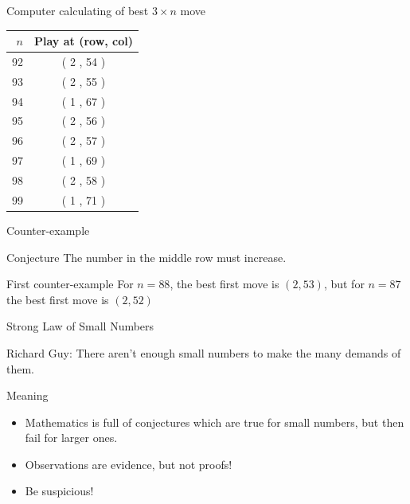 \documentclass{beamer}
\begin{document}
\begin{frame}{Computer calculating of best $3\times n$ move}
\begin{center}
\begin{tabular}{r|c}
\hline
$n$ & Play at (row, col) \\
\hline
92  & ( 2 , 54 ) \\
93  & ( 2 , 55 ) \\
94  & ( 1 , 67 ) \\
95  & ( 2 , 56 ) \\
96  & ( 2 , 57 ) \\
97  & ( 1 , 69 ) \\
98  & ( 2 , 58 ) \\
99  & ( 1 , 71 ) \\
\end{tabular}
\end{center}
\end{frame}

\begin{frame}{Counter-example}
  \begin{block}{Conjecture}
    The number in the middle row must increase.
  \end{block}
\pause
  \begin{block}{First counter-example}
    For $n=88$, the best first move is $(2,53)$, but for $n=87$ the best first move is $(2,52)$
  \end{block}
\end{frame}

\begin{frame}{Strong Law of Small Numbers}
\pause
  \begin{block}{Richard Guy:}
    There aren't enough small numbers to make the many demands of them.
  \end{block}
\pause
  \begin{block}{Meaning}
    \begin{itemize}
\pause
      \item Mathematics is full of conjectures which are true for small numbers, but then fail for larger ones.
\pause
      \item Observations are evidence, but not proofs!
\pause
      \item Be suspicious!
    \end{itemize}
  \end{block}
\end{frame}
\end{document}
